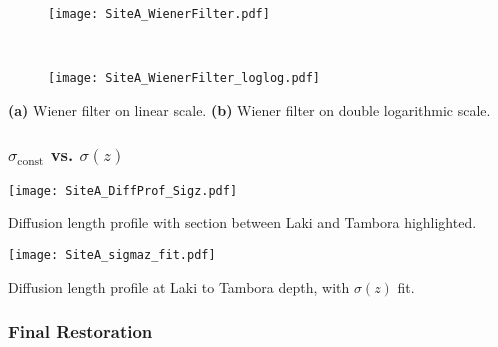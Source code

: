 \documentclass[../../CompleteThesis2/Complete_2ndDraft]{subfiles}
\begin{document}
\begin{marginfigure}
	\centering
	\begin{subfigure}{\marginparwidth}
		\centering
		\texttt{[image: SiteA\_WienerFilter.pdf]}
		\caption{\footnotesize}
		\label{fig:SiteA_WienerFilter}
	\end{subfigure}\\[1ex]
	
	\begin{subfigure}{\marginparwidth}
		\centering
		\texttt{[image: SiteA\_WienerFilter\_loglog.pdf]}
		\caption{\footnotesize}
		\label{fig:SiteA_WienerFilter_loglog}
	\end{subfigure}
	\caption[Wiener filter]{\footnotesize\textbf{(a)} Wiener filter on linear scale. \textbf{(b)} Wiener filter on double logarithmic scale.}
	\label{fig:SiteA_WienerFilters}
\end{marginfigure}

\subsubsection[$\sigma_{\text{const}}$ vs. $\sigma(z)$]{$\sigma_{\text{const}}$ vs. $\sigma(z)$}

\begin{marginfigure}
	\centering
	\texttt{[image: SiteA\_DiffProf\_Sigz.pdf]}
	\caption[Diffusion length profile, LT]{\footnotesize Diffusion length profile with section between Laki and Tambora highlighted.}
	\label{Fig:SiteA_DiffProf_Sigz}
\end{marginfigure}

\begin{marginfigure}
	\centering
	\texttt{[image: SiteA\_sigmaz\_fit.pdf]}
	\caption[Diffusion length profile, fit at LT]{\footnotesize Diffusion length profile at Laki to Tambora depth, with $\sigma(z)$ fit.}
	\label{Fig:SiteA_sigmaz_fit}
\end{marginfigure}
\subsubsection[Final Restoration][Final Restoration]{Final Restoration}
\label{Subsubsec:SignalAnalysis_BackDiffusion_FinalRestoration}
\end{document}
